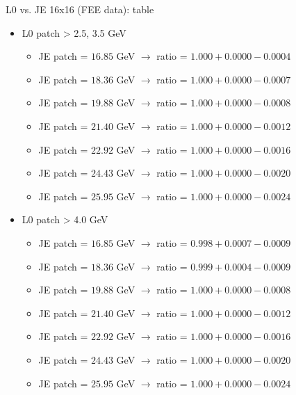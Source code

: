 \documentclass[xcolor={usenames,dvipsnames}]{beamer}
\begin{document}
\begin{frame}{L0 vs. JE 16x16 (FEE data): table}
\begin{itemize}
\item L0 patch > 2.5, 3.5 GeV
\begin{itemize}
\item JE patch = $16.85$ GeV $\rightarrow$ ratio = $1.000 + 0.0000 - 0.0004$
\item JE patch = $18.36$ GeV $\rightarrow$ ratio = $1.000 + 0.0000 - 0.0007$
\item JE patch = $19.88$ GeV $\rightarrow$ ratio = $1.000 + 0.0000 - 0.0008$
\item JE patch = $21.40$ GeV $\rightarrow$ ratio = $1.000 + 0.0000 - 0.0012$
\item JE patch = $22.92$ GeV $\rightarrow$ ratio = $1.000 + 0.0000 - 0.0016$
\item JE patch = $24.43$ GeV $\rightarrow$ ratio = $1.000 + 0.0000 - 0.0020$
\item JE patch = $25.95$ GeV $\rightarrow$ ratio = $1.000 + 0.0000 - 0.0024$
\end{itemize}
\item L0 patch > 4.0 GeV
\begin{itemize}
\item JE patch = $16.85$ GeV $\rightarrow$ ratio = $0.998 + 0.0007 - 0.0009$
\item JE patch = $18.36$ GeV $\rightarrow$ ratio = $0.999 + 0.0004 - 0.0009$
\item JE patch = $19.88$ GeV $\rightarrow$ ratio = $1.000 + 0.0000 - 0.0008$
\item JE patch = $21.40$ GeV $\rightarrow$ ratio = $1.000 + 0.0000 - 0.0012$
\item JE patch = $22.92$ GeV $\rightarrow$ ratio = $1.000 + 0.0000 - 0.0016$
\item JE patch = $24.43$ GeV $\rightarrow$ ratio = $1.000 + 0.0000 - 0.0020$
\item JE patch = $25.95$ GeV $\rightarrow$ ratio = $1.000 + 0.0000 - 0.0024$
\end{itemize}
\end{itemize}
\end{frame}
\end{document}
